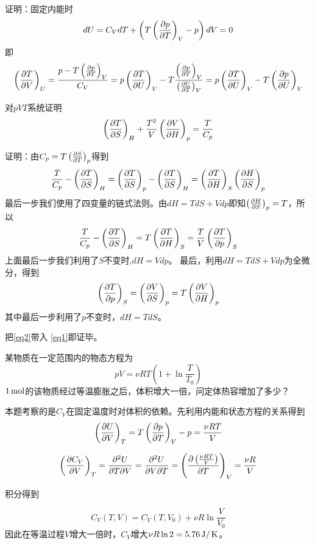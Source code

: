\documentclass[CJK]{beamer}
\begin{document}
\begin{frame}
  \bch
  证明：固定内能时
  $$ dU = C_V dT + \left(T\pfrac pTV - p\right)dV = 0$$
  即
  {\scriptsize
  $$ \pfrac TVU = \frac{p-T\pfrac pTV }{C_V} = p\pfrac TUV - T\frac{\pfrac pTV}{\pfrac UTV}  = p\pfrac TUV - T\pfrac pUV $$}
  \ech
\end{frame}

\begin{frame}
  \bch
  对$pVT$系统证明
  $$\pfrac TSH +\frac{T^2}{V} \pfrac VHp = \frac{T}{C_p} $$
  \ech
\end{frame}

\begin{frame}
  \bch
  {\scriptsize
  证明：由$C_p = T\pfrac STp$得到
  $$ \frac{T}{C_p} - \pfrac TSH = \pfrac TSp - \pfrac TSH = \pfrac THS \pfrac HSp $$
  最后一步我们使用了四变量的链式法则。由$dH = TdS + Vdp$即知$\pfrac HSp = T$，所以
  \begin{equation}
    \frac{T}{C_p} - \pfrac TSH = T \pfrac THS = \frac{T}{V} \pfrac TpS \label{eq1}
  \end{equation}
  上面最后一步我们利用了$S$不变时,$ dH = Vdp$。
  最后，利用$dH  = TdS +Vdp$为全微分，得到
  \begin{equation}
    \pfrac TpS = \pfrac VSp = T\pfrac VHp \label{eq2}
  \end{equation}
  其中最后一步利用了$p$不变时，$dH = TdS$。

  把\eqref{eq2}带入 \eqref{eq1}即证毕。
  
  }
  \ech
\end{frame}

\begin{frame}
  \chtitle{\proid (\sfour)}
  \bch
  某物质在一定范围内的物态方程为
  $$ pV = \nu R T\left(1+\ln\frac{T}{T_0}\right) $$
  $1\SImol$的该物质经过等温膨胀之后，体积增大一倍，问定体热容增加了多少？
  \ech
\end{frame}

\begin{frame}
  \bch
  {\small
    本题考察的是$C_V$在固定温度时对体积的依赖。先利用内能和状态方程的关系得到
    $$\pfrac UVT = T\pfrac pTV - p = \frac{\nu RT}{V} $$
    
  $$\pfrac {C_V}VT = \frac{\partial^2U}{\partial T\partial V} = \frac{\partial^2U}{\partial V\partial T} = \pfrac {\left(\frac{\nu RT}{V}\right)}{T}V =\frac{\nu R}{V} $$

    积分得到

    $$ C_V(T, V) = C_V(T, V_0) + \nu R \ln\frac{V}{V_0}$$
    因此在等温过程$V$增大一倍时，$C_V$增大$\nu R \ln 2 = 5.76 \SIJ/\SIK$。

  }
  \ech
\end{frame}
\end{document}
